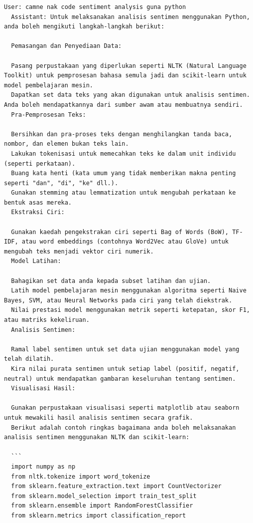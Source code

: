 \documentclass[preprint]{article}
\begin{document}
\begin{lstlisting}[breaklines=true]
  User: camne nak code sentiment analysis guna python
  Assistant: Untuk melaksanakan analisis sentimen menggunakan Python, anda boleh mengikuti langkah-langkah berikut:

  Pemasangan dan Penyediaan Data:
  
  Pasang perpustakaan yang diperlukan seperti NLTK (Natural Language Toolkit) untuk pemprosesan bahasa semula jadi dan scikit-learn untuk model pembelajaran mesin.
  Dapatkan set data teks yang akan digunakan untuk analisis sentimen. Anda boleh mendapatkannya dari sumber awam atau membuatnya sendiri.
  Pra-Pemprosesan Teks:
  
  Bersihkan dan pra-proses teks dengan menghilangkan tanda baca, nombor, dan elemen bukan teks lain.
  Lakukan tokenisasi untuk memecahkan teks ke dalam unit individu (seperti perkataan).
  Buang kata henti (kata umum yang tidak memberikan makna penting seperti "dan", "di", "ke" dll.).
  Gunakan stemming atau lemmatization untuk mengubah perkataan ke bentuk asas mereka.
  Ekstraksi Ciri:
  
  Gunakan kaedah pengekstrakan ciri seperti Bag of Words (BoW), TF-IDF, atau word embeddings (contohnya Word2Vec atau GloVe) untuk mengubah teks menjadi vektor ciri numerik.
  Model Latihan:
  
  Bahagikan set data anda kepada subset latihan dan ujian.
  Latih model pembelajaran mesin menggunakan algoritma seperti Naive Bayes, SVM, atau Neural Networks pada ciri yang telah diekstrak.
  Nilai prestasi model menggunakan metrik seperti ketepatan, skor F1, atau matriks kekeliruan.
  Analisis Sentimen:
  
  Ramal label sentimen untuk set data ujian menggunakan model yang telah dilatih.
  Kira nilai purata sentimen untuk setiap label (positif, negatif, neutral) untuk mendapatkan gambaran keseluruhan tentang sentimen.
  Visualisasi Hasil:
  
  Gunakan perpustakaan visualisasi seperti matplotlib atau seaborn untuk mewakili hasil analisis sentimen secara grafik.
  Berikut adalah contoh ringkas bagaimana anda boleh melaksanakan analisis sentimen menggunakan NLTK dan scikit-learn:
  
  ```
  import numpy as np
  from nltk.tokenize import word_tokenize
  from sklearn.feature_extraction.text import CountVectorizer
  from sklearn.model_selection import train_test_split
  from sklearn.ensemble import RandomForestClassifier
  from sklearn.metrics import classification_report
  

\end{lstlisting}
\end{document}
